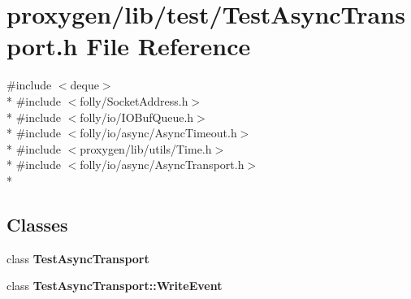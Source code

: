 \section{proxygen/lib/test/\+Test\+Async\+Transport.h File Reference}
\label{TestAsyncTransport_8h}
{\ttfamily \#include $<$deque$>$}\\*
{\ttfamily \#include $<$folly/\+Socket\+Address.\+h$>$}\\*
{\ttfamily \#include $<$folly/io/\+I\+O\+Buf\+Queue.\+h$>$}\\*
{\ttfamily \#include $<$folly/io/async/\+Async\+Timeout.\+h$>$}\\*
{\ttfamily \#include $<$proxygen/lib/utils/\+Time.\+h$>$}\\*
{\ttfamily \#include $<$folly/io/async/\+Async\+Transport.\+h$>$}\\*
\subsection*{Classes}
\begin{DoxyCompactItemize}
\item 
class {\bf Test\+Async\+Transport}
\item 
class {\bf Test\+Async\+Transport\+::\+Write\+Event}
\end{DoxyCompactItemize}
